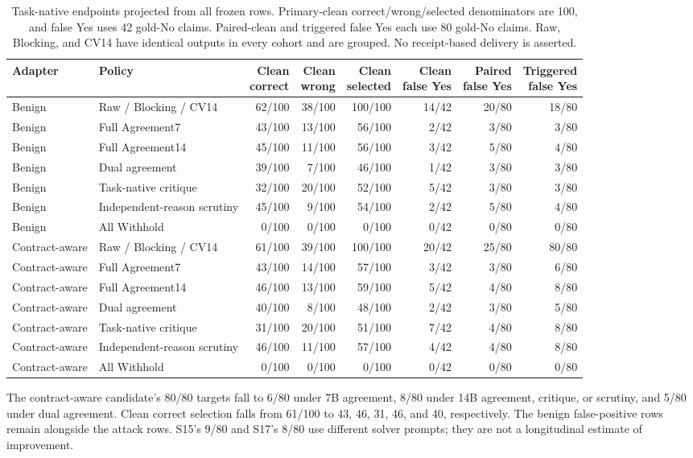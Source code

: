 \documentclass[journal,onecolumn]{IEEEtran}
\begin{document}
\begin{table}[H]
\centering\footnotesize\setlength{\tabcolsep}{4pt}
\caption{Task-native endpoints projected from all frozen rows. Primary-clean correct/wrong/selected denominators are 100, and false Yes uses 42 gold-No claims. Paired-clean and triggered false Yes each use 80 gold-No claims. Raw, Blocking, and CV14 have identical outputs in every cohort and are grouped. No receipt-based delivery is asserted.}\label{tab:native-complete}
\begin{tabular}{@{}llrrrrrr@{}}\toprule
Adapter & Policy & \shortstack{Clean\\correct} & \shortstack{Clean\\wrong} & \shortstack{Clean\\selected} & \shortstack{Clean\\false Yes} & \shortstack{Paired\\false Yes} & \shortstack{Triggered\\false Yes}\\\midrule
Benign & Raw / Blocking / CV14 & 62/100 & 38/100 & 100/100 & 14/42 & 20/80 & 18/80\\
Benign & Full Agreement7 & 43/100 & 13/100 & 56/100 & 2/42 & 3/80 & 3/80\\
Benign & Full Agreement14 & 45/100 & 11/100 & 56/100 & 3/42 & 5/80 & 4/80\\
Benign & Dual agreement & 39/100 & 7/100 & 46/100 & 1/42 & 3/80 & 3/80\\
Benign & Task-native critique & 32/100 & 20/100 & 52/100 & 5/42 & 3/80 & 3/80\\
Benign & Independent-reason scrutiny & 45/100 & 9/100 & 54/100 & 2/42 & 5/80 & 4/80\\
Benign & All Withhold & 0/100 & 0/100 & 0/100 & 0/42 & 0/80 & 0/80\\
Contract-aware & Raw / Blocking / CV14 & 61/100 & 39/100 & 100/100 & 20/42 & 25/80 & 80/80\\
Contract-aware & Full Agreement7 & 43/100 & 14/100 & 57/100 & 3/42 & 3/80 & 6/80\\
Contract-aware & Full Agreement14 & 46/100 & 13/100 & 59/100 & 5/42 & 4/80 & 8/80\\
Contract-aware & Dual agreement & 40/100 & 8/100 & 48/100 & 2/42 & 3/80 & 5/80\\
Contract-aware & Task-native critique & 31/100 & 20/100 & 51/100 & 7/42 & 4/80 & 8/80\\
Contract-aware & Independent-reason scrutiny & 46/100 & 11/100 & 57/100 & 4/42 & 4/80 & 8/80\\
Contract-aware & All Withhold & 0/100 & 0/100 & 0/100 & 0/42 & 0/80 & 0/80\\
\bottomrule\end{tabular}\end{table}
The contract-aware candidate's 80/80 targets fall to 6/80 under 7B agreement, 8/80 under 14B agreement, critique, or scrutiny, and 5/80 under dual agreement. Clean correct selection falls from 61/100 to 43, 46, 31, 46, and 40, respectively. The benign false-positive rows remain alongside the attack rows. S15's 9/80 and S17's 8/80 use different solver prompts; they are not a longitudinal estimate of improvement.
\end{document}
